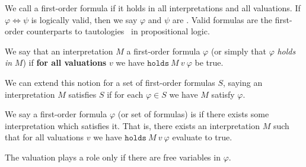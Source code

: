 \begin{node}[Semantics]
\begin{definition}\label{fol-000D}%
We call a first-order formula  if it holds in all
interpretations and all valuations. If $\varphi\iff\psi$ is logically
valid, then we say $\varphi$ and $\psi$ are .
Valid formulas are the first-order counterparts to
tautologies~ in propositional logic.
\end{definition}

\begin{definition}\label{fol-000E}%
We say that an interpretation $M$  a first-order
formula $\varphi$ (or simply that $\varphi$ \textit{holds in} $M$) if
\textbf{for all valuations} $v$ we have $\mathtt{holds}~M~v~\varphi$
be true.

We can extend this notion for a set of first-order formulas $S$, saying
an interpretation $M$ satisfies $S$ if for each $\varphi\in S$ we have
$M$ satisfy $\varphi$.
\end{definition}

\begin{definition}\label{fol-000F}%
We say a first-order formula $\varphi$ (or set of formulas) is
 if there exists some interpretation which satisfies it.
That is, there exists an interpretation $M$ such that for all valuations
$v$ we have $\mathtt{holds}~M~v~\varphi$ evaluate to true.

The valuation plays a role only if there are free variables in $\varphi$.
\end{definition}
\end{node}


